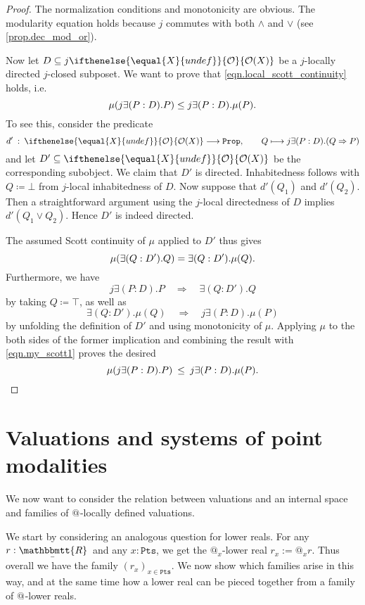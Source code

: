 \documentclass[reqno,11pt]{amsproc}
\makeatletter
\theoremstyle{plain}
\theoremstyle{definition}
\newcommand{\Const}[1]{\mathtt{#1}}
\newcommand{\ubar}[1]{\underaccent{\bar}{#1}}
\newcommand{\internal}[1]{\raisebox{-.03ex}{$\mathbbmtt{#1}$}}
\newcommand{\hs}{\hspace{1pt}}
\newcommand{\trr}{\internal{R}}
\newcommand{\tlrr}{\ubar{\trr}\hs}
\newcommand{\prop}{\Const{Prop}}
\newcommand{\pt}{x}
\newcommand{\Op}[1][undef]{\ifthenelse{\equal{#1}{undef}}{\mathcal{O}}{\mathcal{O}(#1)}}
\newcommand{\pts}{\mathtt{Pts}}		%
\newcommand{\atsymbol}{{@}}
\newcommand{\at}[1][\pt]{\atsymbol_{#1}}
\newcommand{\imp}{\Rightarrow}
\let\originalleft\left
\let\originalright\right
\renewcommand{\left}{\mathopen{}\mathclose\bgroup\originalleft}
\renewcommand{\right}{\aftergroup\egroup\originalright}
\numberwithin{equation}{section}
\makeatother
\begin{document}
\begin{proof}
	The normalization conditions and monotonicity are obvious. The modularity equation holds because $j$ commutes with both $\land$ and $\lor$ (see \cref{prop.dec_mod_or}).

	Now let $D \subseteq j \Op[X]$ be a $j$-locally directed $j$-closed subposet. We want to prove that \eqref{eqn.local_scott_continuity} holds, i.e.\
	\[
		\mu\left( j \exists (P : D) . P \right) \le j \exists (P : D). \mu(P).
	\]
To see this, consider the predicate
	\[
		d' \: : \: \Op[X] \longrightarrow \prop, \qquad Q \longmapsto j \exists (P : D) . (Q \imp P)
	\]
	and let $D'\subseteq\Op[X]$ be the corresponding subobject. We claim that $D'$ is directed. Inhabitedness follows with $Q \coloneqq\bot$ from $j$-local inhabitedness of $D$. Now suppose that $d'(Q_1)$ and $d'(Q_2)$. Then a straightforward argument using the $j$-local directedness of $D$ implies $d'(Q_1 \lor Q_2)$. Hence $D'$ is indeed directed.

	The assumed Scott continuity of $\mu$ applied to $D'$ thus gives
	\begin{equation}\label{eqn.my_scott1}
		\mu\left( \exists (Q : D') . Q \right) = \exists (Q : D') . \mu(Q).
	\end{equation}
	Furthermore, we have
	\[
		j \exists (P : D) . P \quad \Longrightarrow \quad \exists (Q : D') . Q
	\]
	by taking $Q \coloneqq \top$, as well as
	\[
		\exists (Q : D') . \mu(Q) \quad \Longrightarrow \quad j \exists (P : D) . \mu(P)
	\]
	by unfolding the definition of $D'$ and using monotonicity of $\mu$. Applying $\mu$ to the both sides of the former implication and combining the result with \eqref{eqn.my_scott1} proves the desired
	\[
		\mu\left( j \exists (P : D) . P \right) \: \le \: j \exists (P : D) . \mu(P).
\qedhere
	\]
\end{proof}


\section{Valuations and systems of point modalities}

We now want to consider the relation between valuations and an internal space and families of $\at[]$-locally defined valuations.

We start by considering an analogous question for lower reals. For any $r : \tlrr$ and any $\pt : \pts$, we get the $\at$-lower real $r_\pt := \at r$. Thus overall we have the family $(r_\pt)_{\pt \in \pts}$. We now show which families arise in this way, and at the same time how a lower real can be pieced together from a family of $\at[]$-lower reals.
\end{document}
